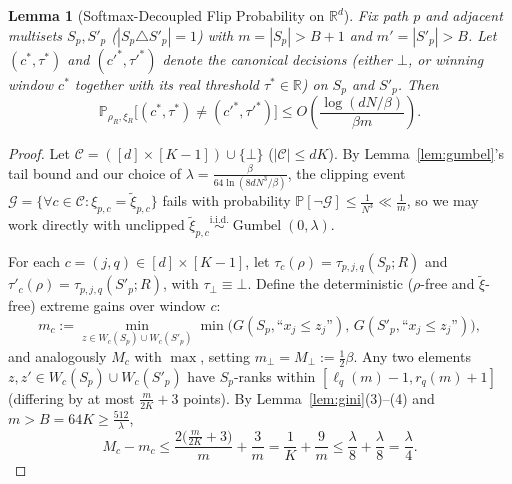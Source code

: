 \documentclass[11pt]{article}
\newtheorem{lemma}{Lemma}
\theoremstyle{definition}
\newcommand{\R}{\mathbb{R}}
\newcommand{\Prob}{\mathbb{P}}
\newcommand{\calC}{\mathcal{C}}
\newcommand{\calG}{\mathcal{G}}
\newcommand{\Gumbel}{\operatorname{Gumbel}}
\begin{document}
\begin{lemma}[Softmax-Decoupled Flip Probability on $\R^d$]
\label{lem:continuous_flip}
Fix path $p$ and adjacent multisets $S_p, S'_p$ ($|S_p \triangle S'_p| = 1$) with $m = |S_p| > B + 1$ and $m' = |S'_p| > B$. Let $(c^*, \tau^*)$ and $(c'^*, \tau'^*)$ denote the canonical decisions (either $\bot$, or winning window $c^*$ together with its real threshold $\tau^* \in \R$) on $S_p$ and $S'_p$. Then
\[
    \Prob_{\rho_R, \xi_R}\big[(c^*, \tau^*) \ne (c'^*, \tau'^*)\big] \le O\left(\frac{\log(dN/\beta)}{\beta m}\right).
\]
\end{lemma}

\begin{proof}
Let $\calC = ([d] \times [K-1]) \cup \{\bot\}$ ($|\calC| \le dK$). By Lemma~\ref{lem:gumbel}'s tail bound and our choice of $\lambda = \frac{\beta}{64 \ln(8dN^3/\beta)}$, the clipping event $\calG = \{\forall c \in \calC : \xi_{p,c} = \tilde{\xi}_{p,c}\}$ fails with probability $\Prob[\neg\calG] \le \frac{1}{N^3} \ll \frac{1}{m}$, so we may work directly with unclipped $\tilde{\xi}_{p,c} \stackrel{\text{i.i.d.}}{\sim} \Gumbel(0, \lambda)$.

For each $c = (j, q) \in [d] \times [K-1]$, let $\tau_c(\rho) = \tau_{p,j,q}(S_p; R)$ and $\tau'_c(\rho) = \tau_{p,j,q}(S'_p; R)$, with $\tau_\bot \equiv \bot$. Define the deterministic ($\rho$-free and $\tilde{\xi}$-free) extreme gains over window $c$:
\[
    m_c := \min_{z \in W_c(S_p) \cup W_c(S'_p)} \min\big(G(S_p, \text{``}x_j \le z_j\text{''}), \, G(S'_p, \text{``}x_j \le z_j\text{''})\big),
\]
and analogously $M_c$ with $\max$, setting $m_\bot = M_\bot := \frac{1}{2}\beta$. Any two elements $z, z' \in W_c(S_p) \cup W_c(S'_p)$ have $S_p$-ranks within $[\ell_q(m) - 1, r_q(m) + 1]$ (differing by at most $\frac{m}{2K} + 3$ points). By Lemma~\ref{lem:gini}(3)--(4) and $m > B = 64K \ge \frac{512}{\lambda}$,
\[
    M_c - m_c \le \frac{2\big(\frac{m}{2K} + 3\big)}{m} + \frac{3}{m} = \frac{1}{K} + \frac{9}{m} \le \frac{\lambda}{8} + \frac{\lambda}{8} = \frac{\lambda}{4}.
\]


\end{proof}
\end{document}
